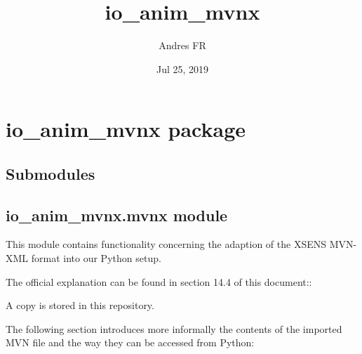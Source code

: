 \documentclass[letterpaper,10pt,english,openany,oneside]{sphinxmanual}
\title{io\_anim\_mvnx}
\date{Jul 25, 2019}
\author{Andres FR}
\begin{document}
\pagestyle{empty}
\sphinxmaketitle
\pagestyle{plain}
\sphinxtableofcontents
\pagestyle{normal}
\label{\detokenize{index::doc}}



\chapter{io\_anim\_mvnx package}
\label{\detokenize{io_anim_mvnx:io-anim-mvnx-package}}\label{\detokenize{io_anim_mvnx::doc}}

\section{Submodules}
\label{\detokenize{io_anim_mvnx:submodules}}

\section{io\_anim\_mvnx.mvnx module}
\label{\detokenize{io_anim_mvnx:module-io_anim_mvnx.mvnx}}\label{\detokenize{io_anim_mvnx:io-anim-mvnx-mvnx-module}}
This module contains functionality concerning the adaption of the
XSENS MVN-XML format into our Python setup.
\begin{description}
\item[{The official explanation can be found in section 14.4 of this document::}] \leavevmode
{}

\end{description}

A copy is stored in this repository.

The following section introduces more informally the contents of the imported
MVN file and the way they can be accessed from Python:
\end{document}
